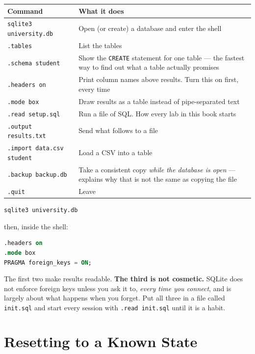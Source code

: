 \begin{longtable}{@{}L{4.6cm}L{10.0cm}@{}}
\toprule
{}
\textbf{Command} & \textbf{What it does} \\
\midrule
\endhead
\texttt{sqlite3 university.db} & Open (or create) a database and enter the
shell \\
\texttt{.tables} & List the tables \\
\texttt{.schema student} & Show the \texttt{CREATE} statement for one table ---
the fastest way to find out what a table actually promises \\
\texttt{.headers on} & Print column names above results. Turn this on first,
every time \\
\texttt{.mode box} & Draw results as a table instead of pipe-separated text \\
\texttt{.read setup.sql} & Run a file of SQL. How every lab in this book starts \\
\texttt{.output results.txt} & Send what follows to a file \\
\texttt{.import data.csv student} & Load a CSV into a table \\
\texttt{.backup backup.db} & Take a consistent copy \emph{while the database is
open} ---  explains why that is not the same as copying the
file \\
\texttt{.quit} & Leave \\
\bottomrule
\end{longtable}

\begin{examplebox}
\begin{lstlisting}[language=bash]
sqlite3 university.db
\end{lstlisting}
then, inside the shell:
\begin{lstlisting}[language=sql]
.headers on
.mode box
PRAGMA foreign_keys = ON;
\end{lstlisting}

\smallskip
The first two make results readable. \textbf{The third is not cosmetic.}
SQLite does not enforce foreign keys unless you ask it to, \emph{every time you
connect}, and  is largely about what happens when you
forget. Put all three in a file called \texttt{init.sql} and start every
session with \texttt{.read init.sql} until it is a habit.
\end{examplebox}

\section{Resetting to a Known State}


